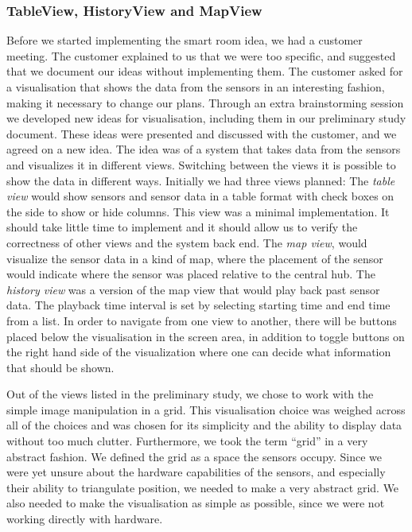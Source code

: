 \documentclass[../document.tex]{subfiles}
\begin{document}
\subsubsection{TableView, HistoryView and MapView}
Before we started implementing the smart room idea, we had a customer meeting. The customer explained to us that we were too specific, and suggested that we document our ideas without implementing them. The customer asked for a visualisation that shows the data from the sensors in an interesting fashion, making it necessary to change our plans. Through an extra brainstorming session we developed new ideas for visualisation, including them in our preliminary study document. These ideas were presented and discussed with the customer, and we agreed on a new idea. The idea was of a system that takes data from the sensors and visualizes it in different views. Switching between the views it is possible to show the data in different ways. Initially we had three views planned: The \emph{table view} would show sensors and sensor data in a table format with check boxes on the side to show or hide columns.  This view was a minimal implementation. It should take little time to implement and it should allow us to verify the correctness of other views and the system back end. The \emph{map view}, would visualize the sensor data in a kind of map, where the placement of the sensor would indicate where the sensor was placed relative to the central hub. The \emph{history view} was a version of the map view that would play back past sensor data. The playback time interval is set by selecting starting time and end time from a list. In order to navigate from one view to another, there will be buttons placed below the visualisation in the screen area, in addition to toggle buttons on the right hand side of the visualization where one can decide what information that should be shown. 

Out of the views listed in the preliminary study, we chose to work with the simple image manipulation in a grid. This visualisation choice was weighed across all of the choices and was chosen for its simplicity and the ability to display data without too much clutter. Furthermore, we took the term “grid” in a very abstract fashion. We defined the grid as a space the sensors occupy. Since we were yet unsure about the hardware capabilities of the sensors, and especially their ability to triangulate position, we needed to make a very abstract grid. We also needed to make the visualisation as simple as possible, since we were not working directly with hardware.
\end{document}
